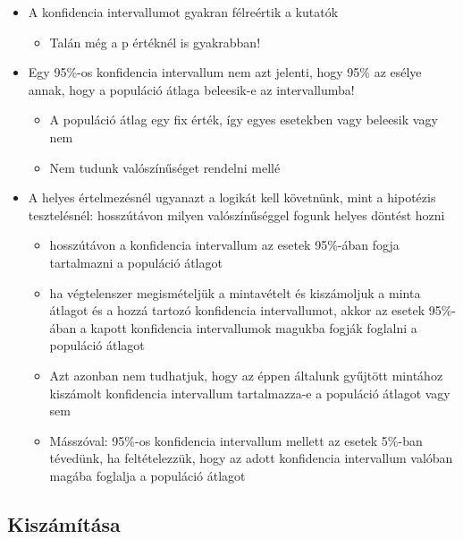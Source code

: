 \documentclass[
  letterpaper,
  DIV=11,
  numbers=noendperiod]{scrreprt}
\providecommand{\tightlist}{%
  \setlength{\itemsep}{0pt}\setlength{\parskip}{0pt}}\usepackage{longtable,booktabs,array}
\begin{document}
\begin{itemize}
\item
  A konfidencia intervallumot gyakran félreértik a kutatók

  \begin{itemize}
  \tightlist
  \item
    Talán még a p értéknél is gyakrabban!
  \end{itemize}
\item
  Egy 95\%-os konfidencia intervallum nem azt jelenti, hogy 95\% az
  esélye annak, hogy a populáció átlaga beleesik-e az intervallumba!

  \begin{itemize}
  \item
    A populáció átlag egy fix érték, így egyes esetekben vagy beleesik
    vagy nem
  \item
    Nem tudunk valószínűséget rendelni mellé
  \end{itemize}
\item
  A helyes értelmezésnél ugyanazt a logikát kell követnünk, mint a
  hipotézis tesztelésnél: hosszútávon milyen valószínűséggel fogunk
  helyes döntést hozni

  \begin{itemize}
  \item
    hosszútávon a konfidencia intervallum az esetek 95\%-ában fogja
    tartalmazni a populáció átlagot~
  \item
    ha végtelenszer megismételjük a mintavételt és kiszámoljuk a minta
    átlagot és a hozzá tartozó konfidencia intervallumot, akkor az
    esetek 95\%-ában a kapott konfidencia intervallumok magukba fogják
    foglalni a populáció átlagot
  \item
    Azt azonban nem tudhatjuk, hogy az éppen általunk gyűjtött mintához
    kiszámolt konfidencia intervallum tartalmazza-e a populáció átlagot
    vagy sem
  \item
    Másszóval: 95\%-os konfidencia intervallum mellett az esetek 5\%-ban
    tévedünk, ha feltételezzük, hogy az adott konfidencia intervallum
    valóban magába foglalja a populáció átlagot
  \end{itemize}
\end{itemize}

\hypertarget{kiszuxe1muxedtuxe1sa}{%
\subsection{Kiszámítása}\label{kiszuxe1muxedtuxe1sa}}
\end{document}
